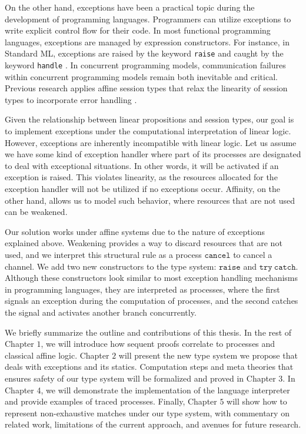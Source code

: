 \documentclass[12pt]{memoir}
\begin{document}
On the other hand, exceptions have been a practical topic during the development of programming languages.
Programmers can utilize exceptions to write explicit control flow for their code. In most functional programming languages, exceptions are managed by expression constructors. 
For instance, in Standard ML, exceptions are raised by the keyword \texttt{raise} and caught by the keyword \texttt{handle} \citep{Milner1997}. 
In concurrent programming models, communication failures within concurrent programming models remain both inevitable and critical. 
Previous research applies affine session types that relax the linearity of session types to incorporate error handling \citep{Mos2014}.

Given the relationship between linear propositions and session types, our goal is to implement exceptions under the computational interpretation of linear logic.
However, exceptions are inherently incompatible with linear logic. 
Let us assume we have some kind of exception handler where part of its processes are designated to deal with exceptional situations. 
In other words, it will be activated if an exception is raised. 
This violates linearity, as the resources allocated for the exception handler will not be utilized if no exceptions occur. 
Affinity, on the other hand, allows us to model such behavior, where resources that are not used can be weakened.

Our solution works under affine systems due to the nature of exceptions explained above. 
Weakening provides a way to discard resources that are not used, and we interpret this structural rule as a process $\texttt{cancel}$ to cancel a channel. 
We add two new constructors to the type system: $\texttt{raise}$ and $\texttt{try}\ \texttt{catch}$. 
Although these constructors look similar to most exception handling mechanisms in programming languages, 
they are interpreted as processes, where the first signals an exception during the computation of processes, and the second catches the signal and activates another branch concurrently.

We briefly summarize the outline and contributions of this thesis.
In the rest of Chapter $1$, we will introduce how sequent proofs correlate to processes and classical affine logic.
Chapter $2$ will present the new type system we propose that deals with exceptions and its statics.
Computation steps and meta theories that ensures safety of our type system will be formalized and proved in Chapter $3$. 
In Chapter 4, we will demonstrate the implementation of the language interpreter and provide examples of traced processes.
Finally, Chapter $5$ will show how to represent non-exhaustive matches under our type system, with commentary on related work, limitations of the current approach, and avenues for future research.
\end{document}
